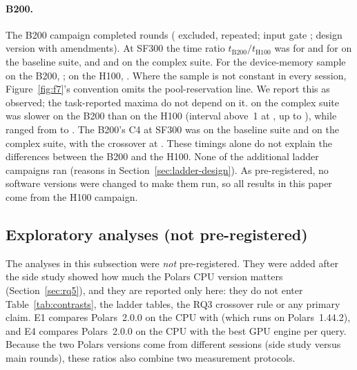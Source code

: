 \documentclass[11pt]{article}
\begin{document}
\paragraph{B200.} The B200 campaign completed
 rounds ( excluded,
 repeated; input gate ; design
version \texttt{} with
 amendments). At SF300
the time ratio $t_{\mathrm{B200}}/t_{\mathrm{H100}}$ was
 for \polarsgpu{} and
 for \sparkgpu{} on the
baseline suite, and  and
 on the complex suite.
For the \sparkgpu{} device-memory sample on the B200,
; on the H100,
. Where the sample is not constant in every
session, Figure~\ref{fig:f7}'s convention omits the pool-reservation line. We
report this as observed; the task-reported maxima do not depend on it.
\polarsgpu{} on the complex suite was slower on the B200 than on the H100
(interval above~1 at , up to
), while \sparkgpu{} ranged from
 to .
The B200's C4 at SF300 was  on the
baseline suite and  on the complex suite,
with the crossover at . These timings alone do not explain the
differences between the B200 and the H100.
\fi
\fi
\ifladderran\else
None of the additional ladder campaigns ran (reasons in
Section~\ref{sec:ladder-design}). As pre-registered, no software versions
were changed to make them run, so all results in this paper come from the H100
campaign.
\fi

\subsection{Exploratory analyses (not pre-registered)}
\label{sec:exploratory}
The analyses in this subsection were \emph{not} pre-registered. They were
added after the side study showed how much the Polars CPU version matters
(Section~\ref{sec:rq5}), and they are reported only here: they do not enter
Table~\ref{tab:contrasts}, the ladder tables, the RQ3 crossover rule or any
primary claim. E1 compares Polars~2.0.0 on the CPU with \polarsgpu{} (which
runs on Polars~1.44.2), and E4 compares Polars~2.0.0 on the CPU with the best
GPU engine per query. Because the two Polars versions come from different
sessions (side study versus main rounds), these ratios also combine two
measurement protocols.
\end{document}
